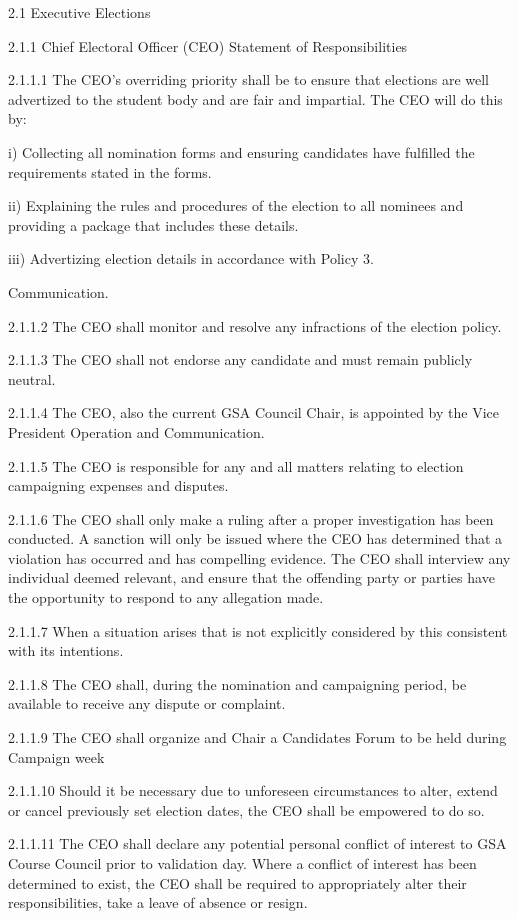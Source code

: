 ﻿2.1 Executive Elections 
 
 2.1.1 Chief Electoral Officer (CEO) Statement of Responsibilities 
 
 2.1.1.1 The CEO’s overriding priority shall be to ensure that elections are well advertized to the student body and are fair and impartial. The CEO will do this by: 
 
 i) Collecting all nomination forms and ensuring candidates have fulfilled the requirements stated in the forms. 
 
 ii) Explaining the rules and procedures of the election to all nominees and providing a package that includes these details. 
 
 iii) Advertizing election details in accordance with Policy 3. 
 
 Communication. 
 
 2.1.1.2 The CEO shall monitor and resolve any infractions of the election policy. 
 
 2.1.1.3 The CEO shall not endorse any candidate and must remain publicly neutral. 
 
 2.1.1.4 The CEO, also the current GSA Council Chair, is appointed by the Vice President Operation and Communication. 
 
 2.1.1.5 The CEO is responsible for any and all matters relating to election campaigning expenses and disputes. 
 
 2.1.1.6 The CEO shall only make a ruling after a proper investigation has been conducted. A sanction will only be issued where the CEO has determined that a violation has occurred and has compelling evidence. The CEO shall interview any individual deemed relevant, and ensure that the offending party or parties have the opportunity to respond to any allegation made.
 
 2.1.1.7 When a situation arises that is not explicitly considered by this consistent with its intentions. 
 
 2.1.1.8 The CEO shall, during the nomination and campaigning period, be available to receive any dispute or complaint. 
 
 2.1.1.9 The CEO shall organize and Chair a Candidates Forum to be held during Campaign week 
 
 2.1.1.10 Should it be necessary due to unforeseen circumstances to alter, extend or cancel previously set election dates, the CEO shall be empowered to do so. 
 
 2.1.1.11 The CEO shall declare any potential personal conflict of interest to GSA Course Council prior to validation day. Where a conflict of interest has been determined to exist, the CEO shall be required to appropriately alter their responsibilities, take a leave of absence or resign. 
 
